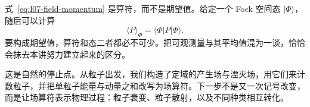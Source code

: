 式~\eqref{eq:l07-field-momentum} 是算符，而不是期望值。给定一个 Fock 空间态 \(|\Phi\rangle\)，随后可以计算
\begin{equation}
\langle P\rangle_\Phi=\langle\Phi|P|\Phi\rangle.
\end{equation}
要构成期望值，算符和态二者都必不可少。把可观测量与其平均值混为一谈，恰恰会抹去本讲努力建立起来的区分。

\begin{classroomqa}
\end{classroomqa}

这是自然的停止点。从粒子出发，我们构造了定域的产生场与湮灭场，用它们来计数粒子，并把单粒子能量与动量之和改写为场算符。下一步不是又一次记号改变，而是让场算符表示物理过程：粒子衰变、粒子散射，以及不同种类相互转化。
